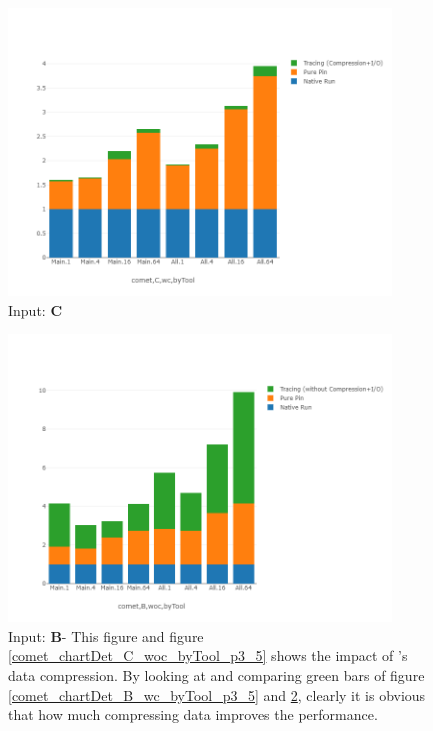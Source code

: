 \begin{figure}[!t]
\centering
\includegraphics[width=4in]{figs.comet/comet_chartDet_C_wc_byTool_p3_5.png}
\caption{ Input: \textbf{C}
}
\label{comet_chartDet_C_wc_byTool_p3_5}
\end{figure}





\begin{figure}[!t]
\centering
\includegraphics[width=4in]{figs.comet/comet_chartDet_B_woc_byTool_p3_5.png}
\caption{ Input: \textbf{B}- This figure and figure \ref{comet_chartDet_C_woc_byTool_p3_5} shows the impact of \parlot 's data compression. By looking at and comparing green bars of figure \ref{comet_chartDet_B_wc_byTool_p3_5} and \ref{comet_chartDet_B_woc_byTool_p3_5}, clearly it is obvious that how much compressing data improves the performance.
}
\label{comet_chartDet_B_woc_byTool_p3_5}
\end{figure}

